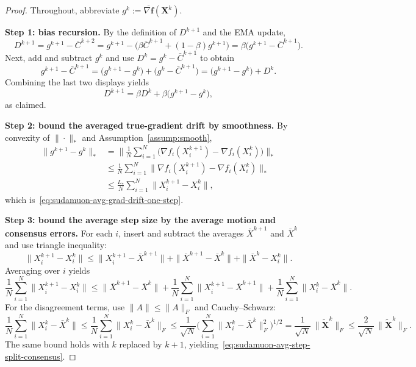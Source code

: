 \documentclass{article}
\begin{document}
\begin{proof}
Throughout, abbreviate $g^k:=\overline{\nabla \mathbf f}(\mathbf X^k)$.

\medskip\noindent\textbf{Step 1: bias recursion.}
By the definition of $D^{k+1}$ and the EMA update,
\[
D^{k+1}
= g^{k+1}-\bar C^{k+2}
= g^{k+1}-\bigl(\beta\bar C^{k+1}+(1-\beta)g^{k+1}\bigr)
= \beta\bigl(g^{k+1}-\bar C^{k+1}\bigr).
\]
Next, add and subtract $g^k$ and use $D^k=g^k-\bar C^{k+1}$ to obtain
\[
    g^{k+1}-\bar C^{k+1}
    = \bigl(g^{k+1}-g^k\bigr)+\bigl(g^k-\bar C^{k+1}\bigr)
    = \bigl(g^{k+1}-g^k\bigr)+D^k.
\]
Combining the last two displays yields
\[
    D^{k+1}
    = \beta D^k + \beta\bigl(g^{k+1}-g^k\bigr),
\]
as claimed.

\medskip\noindent\textbf{Step 2: bound the averaged true-gradient drift by smoothness.}
By convexity of $\|\cdot\|_*$ and Assumption~\ref{assump:smooth},
\[
\begin{aligned}
\|g^{k+1}-g^k\|_*
&= \Big\|\frac{1}{N}\sum_{i=1}^N\bigl(\nabla f_i(X_i^{k+1})-\nabla f_i(X_i^k)\bigr)\Big\|_* \\
&\le \frac{1}{N}\sum_{i=1}^N\|\nabla f_i(X_i^{k+1})-\nabla f_i(X_i^k)\|_* \\
&\le \frac{L_*}{N}\sum_{i=1}^N\|X_i^{k+1}-X_i^k\|,
\end{aligned}
\]
which is~\eqref{eq:sudamuon-avg-grad-drift-one-step}.

\medskip\noindent\textbf{Step 3: bound the average step size by the average motion and consensus errors.}
For each $i$, insert and subtract the averages $\bar X^{k+1}$ and $\bar X^k$ and use triangle inequality:
\[
\|X_i^{k+1}-X_i^k\|
\le
\|X_i^{k+1}-\bar X^{k+1}\| + \|\bar X^{k+1}-\bar X^k\| + \|\bar X^k-X_i^k\|.
\]
Averaging over $i$ yields
\[
\frac{1}{N}\sum_{i=1}^N \|X_i^{k+1}-X_i^k\|
\le
\|\bar X^{k+1}-\bar X^k\|
+ \frac{1}{N}\sum_{i=1}^N\|X_i^{k+1}-\bar X^{k+1}\|
+ \frac{1}{N}\sum_{i=1}^N\|X_i^{k}-\bar X^{k}\|.
\]
For the disagreement terms, use $\|A\|\le \|A\|_F$ and Cauchy--Schwarz:
\[
\frac{1}{N}\sum_{i=1}^N\|X_i^{k}-\bar X^{k}\|
\le
\frac{1}{N}\sum_{i=1}^N\|X_i^{k}-\bar X^{k}\|_F
\le
\frac{1}{\sqrt N}\Big(\sum_{i=1}^N\|X_i^{k}-\bar X^{k}\|_F^2\Big)^{1/2}
= \frac{1}{\sqrt N}\,\|\tilde{\mathbf X}^{k}\|_F
\le \frac{2}{\sqrt N}\,\|\tilde{\mathbf X}^{k}\|_F.
\]
The same bound holds with $k$ replaced by $k+1$, yielding~\eqref{eq:sudamuon-avg-step-split-consensus}.


\end{proof}
\end{document}
